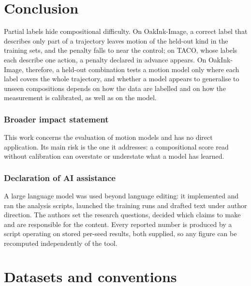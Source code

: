 \documentclass[10pt]{article}
\begin{document}
\section{Conclusion}

Partial labels hide compositional difficulty. On OakInk-Image, a correct label that describes only part of a trajectory leaves motion of the held-out kind in the training sets, and the penalty falls to near the control; on TACO, whose labels each describe one action, a penalty declared in advance appears. On OakInk-Image, therefore, a held-out combination tests a motion model only where each label covers the whole trajectory, and whether a model appears to generalise to unseen compositions depends on how the data are labelled and on how the measurement is calibrated, as well as on the model.

\subsubsection*{Broader impact statement}

This work concerns the evaluation of motion models and has no direct application. Its main risk is the one it addresses: a compositional score read without calibration can overstate or understate what a model has learned.

\subsubsection*{Declaration of AI assistance}

A large language model was used beyond language editing: it implemented and ran the analysis scripts, launched the training runs and drafted text under author direction. The authors set the research questions, decided which claims to make and are responsible for the content. Every reported number is produced by a script operating on stored per-seed results, both supplied, so any figure can be recomputed independently of the tool.




\appendix
\renewcommand{\thetable}{A\arabic{table}}
\setcounter{table}{0}

\section{Datasets and conventions}
\end{document}
